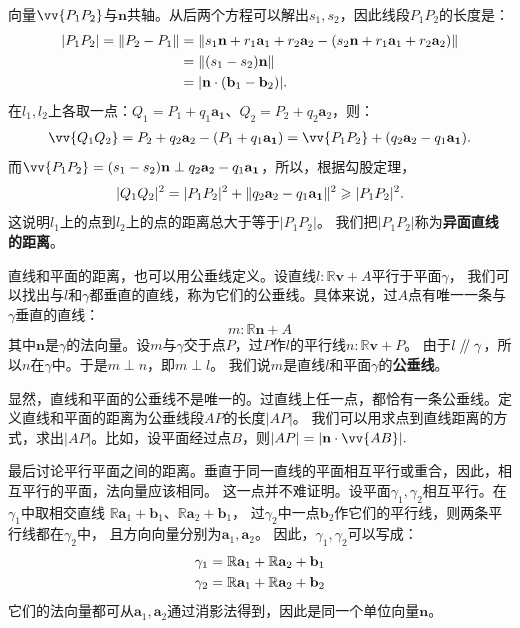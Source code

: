 \documentclass[12pt,UTF8]{ctexbook}
\renewcommand\parallel{\mathrel{/\mskip-4mu/}}
\begin{document}
向量$\vv{P_1P_2}$与$\mathbf{n}$共轴。从后两个方程可以解出$s_1,s_2$，因此线段$P_1P_2$的长度是：
\begin{align}
    |P_1P_2| = \|P_2 - P_1\| &= \|s_1\mathbf{n} + r_1\mathbf{a}_1 + r_2\mathbf{a}_2 - (s_2\mathbf{n} + r_1\mathbf{a}_1 + r_2\mathbf{a}_2)\| \notag \\
    &= \| (s_1 - s_2)\mathbf{n} \| \notag \\
    &= |\mathbf{n}\cdot(\mathbf{b}_1 - \mathbf{b}_2)|. \notag
\end{align}
在$l_1,l_2$上各取一点：$Q_1 = P_1 + q_1\mathbf{a_1}$、$Q_2 = P_2 + q_2\mathbf{a}_2$，则：
\begin{align}
    \vv{Q_1Q_2} = P_2 + q_2\mathbf{a}_2 - (P_1 + q_1\mathbf{a_1}) = \vv{P_1P_2}  + (q_2\mathbf{a}_2 - q_1\mathbf{a_1}). \notag 
\end{align}
而$\vv{P_1P_2} = (s_1 - s_2)\mathbf{n} \perp q_2\mathbf{a}_2 - q_1\mathbf{a_1}$，所以，根据勾股定理，
\begin{align}
    |Q_1Q_2|^2 = |P_1P_2|^2 + \|q_2\mathbf{a}_2 - q_1\mathbf{a_1}\|^2 \geqslant |P_1P_2|^2. \notag 
\end{align}
这说明$l_1$上的点到$l_2$上的点的距离总大于等于$|P_1P_2|$。
我们把$|P_1P_2|$称为\textbf{异面直线的距离}。

直线和平面的距离，也可以用公垂线定义。设直线$l:\mathbb{R}\mathbf{v} + A$平行于平面$\gamma$，
我们可以找出与$l$和$\gamma$都垂直的直线，称为它们的公垂线。具体来说，过$A$点有唯一一条与$\gamma$垂直的直线：
$$ m:\mathbb{R}\mathbf{n} + A $$
其中$\mathbf{n}$是$\gamma$的法向量。设$m$与$\gamma$交于点$P$，过$P$作$l$的平行线$n:\mathbb{R}\mathbf{v} + P$。
由于$l\parallel\gamma$，所以$n$在$\gamma$中。于是$m\perp n$，即$m\perp l$。
我们说$m$是直线$l$和平面$\gamma$的\textbf{公垂线}。

显然，直线和平面的公垂线不是唯一的。过直线上任一点，都恰有一条公垂线。定义直线和平面的距离为公垂线段$AP$的长度$|AP|$。
我们可以用求点到直线距离的方式，求出$|AP|$。比如，设平面经过点$B$，则$|AP| = |\mathbf{n}\cdot \vv{AB}|.$

最后讨论平行平面之间的距离。垂直于同一直线的平面相互平行或重合，因此，相互平行的平面，法向量应该相同。
这一点并不难证明。设平面$\gamma_1,\gamma_2$相互平行。在$\gamma_1$中取相交直线
$\mathbb{R}\mathbf{a}_1 + \mathbf{b}_1$、$\mathbb{R}\mathbf{a}_2 + \mathbf{b}_1$，
过$\gamma_2$中一点$\mathbf{b}_2$作它们的平行线，则两条平行线都在$\gamma_2$中，
且方向向量分别为$\mathbf{a}_1,\mathbf{a}_2$。
因此，$\gamma_1,\gamma_2$可以写成：
\begin{align}
    \gamma_1 = \mathbb{R}\mathbf{a}_1 + \mathbb{R}\mathbf{a}_2 + \mathbf{b}_1 \notag \\
    \gamma_2 = \mathbb{R}\mathbf{a}_1 + \mathbb{R}\mathbf{a}_2 + \mathbf{b}_2 \notag
\end{align}
它们的法向量都可从$\mathbf{a}_1,\mathbf{a}_2$通过消影法得到，因此是同一个单位向量$\mathbf{n}$。
\end{document}

